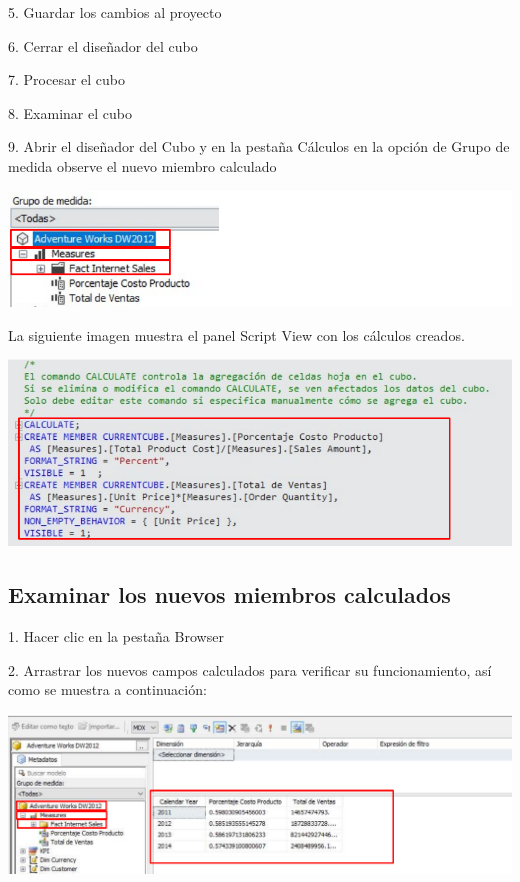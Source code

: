 5. Guardar los cambios al proyecto

6. Cerrar el diseñador del cubo

7. Procesar el cubo

8. Examinar el cubo

9. Abrir el diseñador del Cubo y en la pestaña Cálculos en la opción de Grupo de medida observe el nuevo miembro
calculado

	\begin{center}
	\includegraphics[width=\columnwidth]{images/task7/img10}
	\end{center}	


La siguiente imagen muestra el panel Script View con los cálculos creados.

	\begin{center}
	\includegraphics[width=\columnwidth]{images/task7/img11}
	\end{center}	


\subsection{Examinar los nuevos miembros calculados}  

1. Hacer clic en la pestaña Browser

2. Arrastrar los nuevos campos calculados para verificar su funcionamiento, así como se muestra a continuación:

	\begin{center}
	\includegraphics[width=\columnwidth]{images/task7/img12}
	\end{center}	
